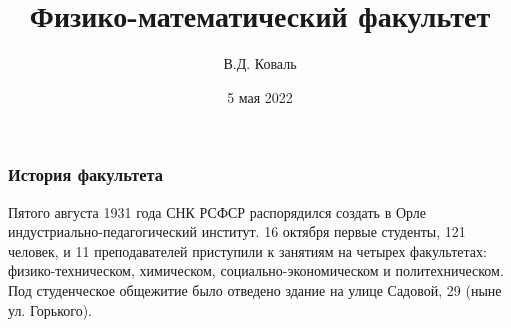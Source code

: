 \documentclass[pdf,hyperref={unicode}, aspectratio=43, serif,11pt]{beamer}
\title[ФизМат]{Физико-математический факультет}
\author{ В.Д. Коваль}
\date{5 мая 2022}
\institute[]{Орловский государственный
университет имени И.\,С.~Тургенева}
\begin{document}
\begin{frame}
\titlepage
\end{frame}


\begin{frame}
\frametitle{История факультета}
\tiny{Пятого августа 1931 года СНК РСФСР распорядился создать в Орле индустриально-педагогический институт. 16 октября первые студенты, 121 человек, и 11 преподавателей приступили к занятиям на четырех факультетах: физико-техническом, химическом, социально-экономическом и политехническом. Под студенческое общежитие было отведено здание на улице Садовой, 29 (ныне ул. Горького).
}
\begin{figure}[!h]
\centering
{}
\end{figure}

\end{frame}
\end{document}
